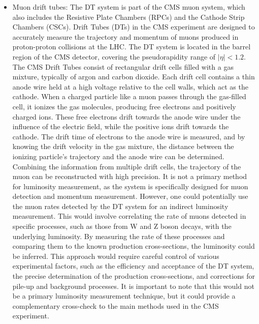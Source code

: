 \begin{itemize}

\item Muon drift tubes: The DT system is part of the CMS muon system, which also includes the Resistive Plate Chambers (RPCs) and the Cathode Strip Chambers (CSCs). Drift Tubes (DTs) in the CMS experiment are designed to accurately measure the trajectory and momentum of muons produced in proton-proton collisions at the LHC. The DT system is located in the barrel region of the CMS detector, covering the pseudorapidity range of $|\eta| < 1.2$. The CMS Drift Tubes consist of rectangular drift cells filled with a gas mixture, typically of argon and carbon dioxide. Each drift cell contains a thin anode wire held at a high voltage relative to the cell walls, which act as the cathode. When a charged particle like a muon passes through the gas-filled cell, it ionizes the gas molecules, producing free electrons and positively charged ions. These free electrons drift towards the anode wire under the influence of the electric field, while the positive ions drift towards the cathode. The drift time of electrons to the anode wire is measured, and by knowing the drift velocity in the gas mixture, the distance between the ionizing particle's trajectory and the anode wire can be determined. Combining the information from multiple drift cells, the trajectory of the muon can be reconstructed with high precision. It is not a primary method for luminosity measurement, as the system is specifically designed for muon detection and momentum measurement. However, one could potentially use the muon rates detected by the DT system for an indirect luminosity measurement. This would involve correlating the rate of muons detected in specific processes, such as those from W and Z boson decays, with the underlying luminosity. By measuring the rate of these processes and comparing them to the known production cross-sections, the luminosity could be inferred. This approach would require careful control of various experimental factors, such as the efficiency and acceptance of the DT system, the precise determination of the production cross-sections, and corrections for pile-up and background processes. It is important to note that this would not be a primary luminosity measurement technique, but it could provide a complementary cross-check to the main methods used in the CMS experiment.


\end{itemize}

